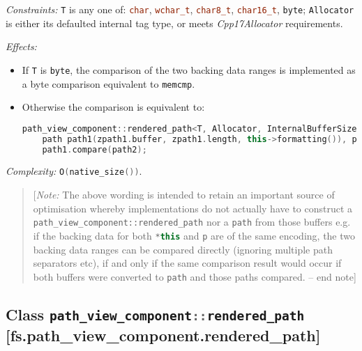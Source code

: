 \documentclass[11pt]{article}
\newcommand{\code}[2][cpp]{\lstinline[language=#1,basicstyle=\small\ttfamily]{#2}}
\newcommand{\desc}[1]{\textit{#1}}
\newcommand{\constraints}{\desc{Constraints: }}
\newcommand{\effects}{\desc{Effects: }}
\newcommand{\complexity}{\desc{Complexity: }}
\newcommand{\note}[1]{\begin{quote}[\textit{Note:} #1 -- end note]\end{quote}}
\begin{document}
\constraints \code{T} is any one of: \code{char}, \code{wchar_t}, \code{char8_t}, \code{char16_t}, \code{byte}; \code{Allocator} is either its defaulted internal tag type, or meets \emph{Cpp17Allocator} requirements.

\effects
\begin{itemize}
    \item If \code{T} is \code{byte}, the comparison of the two backing data ranges is implemented as a byte comparison equivalent to \code{memcmp}.
    \item Otherwise the comparison is equivalent to:
    \begin{lstlisting}[language=cpp]
    path_view_component::rendered_path<T, Allocator, InternalBufferSize> zpath1(*this), zpath2(p);
    path path1(zpath1.buffer, zpath1.length, this->formatting()), path2(zpath2.buffer, zpath2.length, p.formatting());
    path1.compare(path2);
    \end{lstlisting}
\end{itemize}

\complexity \code{O(native_size())}.\\

\color{black}

\note{The above wording is intended to retain an important source of optimisation whereby implementations do not actually have to construct a \code{path_view_component::rendered_path} nor a \code{path} from those buffers e.g. if the backing data for both \code{*this} and \code{p} are of the same encoding, the two backing data ranges can be compared directly (ignoring multiple path separators etc), if and only if the same comparison result would occur if both buffers were converted to \code{path} and those paths compared.}


\subsection*{Class \code{path_view_component::rendered_path} [fs.path\_view\_component.rendered\_path]}
\end{document}
